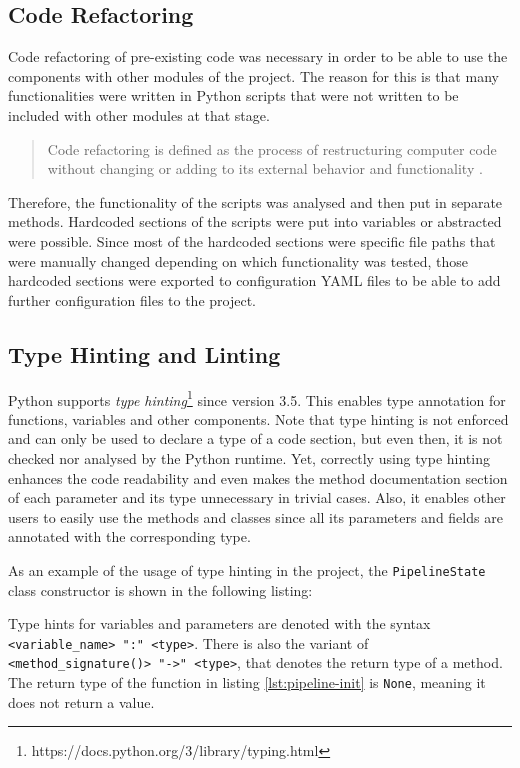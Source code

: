 \documentclass{article}
\begin{document}
    \subsection{Code Refactoring}
    \label{sec:code-refactoring-code-quality}

        Code refactoring of pre-existing code was necessary in order to be able to use the components with other modules of the project.
        The reason for this is that many functionalities were written in Python scripts that were not written to be included with other modules at that stage.
        \begin{quote}
            Code refactoring is defined as the process of restructuring computer code without changing or adding to its external behavior and functionality \cite{wattsWhatCodeRefactoring2018}.
        \end{quote}
        Therefore, the functionality of the scripts was analysed and then put in separate methods.
        Hardcoded sections of the scripts were put into variables or abstracted were possible. 
        Since most of the hardcoded sections were specific file paths that were manually changed depending on which functionality was tested, those hardcoded sections were exported to configuration YAML files to be able to add further configuration files to the project.


    \subsection{Type Hinting and Linting}
    \label{sec:type-hinting-code-quality}

        Python supports \emph{type hinting}\footnote{https://docs.python.org/3/library/typing.html} since version 3.5.
        This enables type annotation for functions, variables and other components.
        Note that type hinting is not enforced and can only be used to declare a type of a code section, but even then, it is not checked nor analysed by the Python runtime.
        Yet, correctly using type hinting enhances the code readability and even makes the method documentation section of each parameter and its type unnecessary in trivial cases. Also, it enables other users to easily use the methods and classes since all its parameters and fields are annotated with the corresponding type.

        As an example of the usage of type hinting in the project, the \texttt{PipelineState} class constructor is shown in the following listing:
        
        Type hints for variables and parameters are denoted with the syntax \texttt{<variable\_name> ":" <type>}.
        There is also the variant of \texttt{<method\_signature()> "->" <type>}, that denotes the return type of a method.
        The return type of the function in listing \ref{lst:pipeline-init} is \texttt{None}, meaning it does not return a value.
\end{document}
